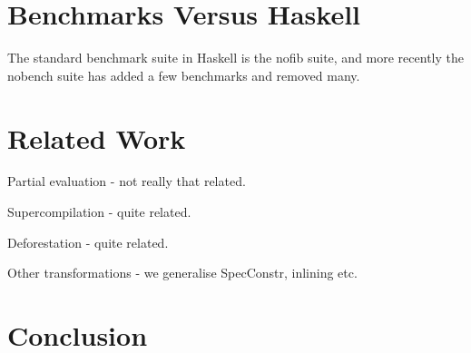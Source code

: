 \documentclass{llncs}
\begin{document}
\section{Benchmarks Versus Haskell}

The standard benchmark suite in Haskell is the nofib suite, and more recently the nobench suite has added a few benchmarks and removed many.

\section{Related Work}

Partial evaluation - not really that related.

Supercompilation - quite related.

Deforestation - quite related.

Other transformations - we generalise SpecConstr, inlining etc.

\section{Conclusion}
\end{document}
